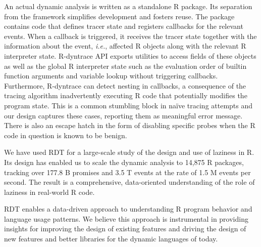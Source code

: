 \documentclass[acmsmall,review]{acmart}
\newcommand{\Ie}{\emph{i.e.}\xspace}
\newcommand{\RDT}{RDT\xspace}
\newcommand{\RDyntrace}{R-dyntrace\xspace}
\begin{document}
\indent An actual dynamic analysis is written as a standalone R package. Its
separation from the framework simplifies development and fosters reuse. The
package contains code that defines tracer state and registers callbacks for the
relevant events. When a callback is triggered, it receives the tracer state
together with the information about the event, \Ie, affected R objects along
with the relevant R interpreter state. \RDyntrace API exports utilities to access
fields of these objects as well as the global R interpreter state such as the
evaluation order of builtin function arguments and variable lookup without
triggering callbacks. Furthermore, \RDyntrace can detect nesting in callbacks,
a consequence of the tracing algorithm inadvertently executing R code that
potentially modifies the program state. This is a common stumbling block in
na\"ive tracing attempts and our design captures these cases, reporting them as
meaningful error message. There is also an escape hatch in the form of disabling
specific probes when the R code in question is known to be benign.

We have used \RDT for a large-scale study of the design and use of laziness in
R. Its design has enabled us to scale the dynamic analysis to 14,875 R packages,
tracking over 177.8 B promises and 3.5 T events at the rate of 1.5 M events per
second. The result is a comprehensive, data-oriented understanding of the role
of laziness in real-world R code.

\RDT enables a data-driven approach to understanding R program behavior and
language usage patterns. We believe this approach is instrumental in providing
insights for improving the design of existing features and driving the design of
new features and better libraries for the dynamic languages of today.
\end{document}
